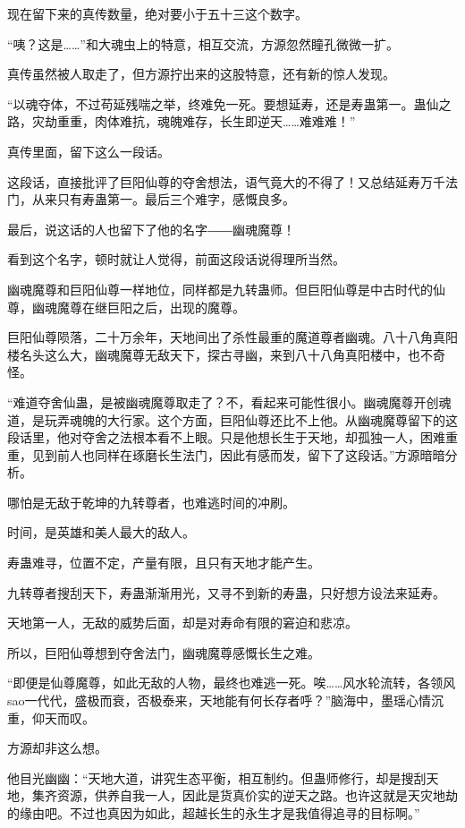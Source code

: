 \begin{this_body}
现在留下来的真传数量，绝对要小于五十三这个数字。

“咦？这是……”和大魂虫上的特意，相互交流，方源忽然瞳孔微微一扩。

真传虽然被人取走了，但方源拧出来的这股特意，还有新的惊人发现。

“以魂夺体，不过苟延残喘之举，终难免一死。要想延寿，还是寿蛊第一。蛊仙之路，灾劫重重，肉体难抗，魂魄难存，长生即逆天……难难难！”

真传里面，留下这么一段话。

这段话，直接批评了巨阳仙尊的夺舍想法，语气竟大的不得了！又总结延寿万千法门，从来只有寿蛊第一。最后三个难字，感慨良多。

最后，说这话的人也留下了他的名字――幽魂魔尊！

看到这个名字，顿时就让人觉得，前面这段话说得理所当然。

幽魂魔尊和巨阳仙尊一样地位，同样都是九转蛊师。但巨阳仙尊是中古时代的仙尊，幽魂魔尊在继巨阳之后，出现的魔尊。

巨阳仙尊陨落，二十万余年，天地间出了杀性最重的魔道尊者幽魂。八十八角真阳楼名头这么大，幽魂魔尊无敌天下，探古寻幽，来到八十八角真阳楼中，也不奇怪。

“难道夺舍仙蛊，是被幽魂魔尊取走了？不，看起来可能性很小。幽魂魔尊开创魂道，是玩弄魂魄的大行家。这个方面，巨阳仙尊还比不上他。从幽魂魔尊留下的这段话里，他对夺舍之法根本看不上眼。只是他想长生于天地，却孤独一人，困难重重，见到前人也同样在琢磨长生法门，因此有感而发，留下了这段话。”方源暗暗分析。

哪怕是无敌于乾坤的九转尊者，也难逃时间的冲刷。

时间，是英雄和美人最大的敌人。

寿蛊难寻，位置不定，产量有限，且只有天地才能产生。

九转尊者搜刮天下，寿蛊渐渐用光，又寻不到新的寿蛊，只好想方设法来延寿。

天地第一人，无敌的威势后面，却是对寿命有限的窘迫和悲凉。

所以，巨阳仙尊想到夺舍法门，幽魂魔尊感慨长生之难。

“即便是仙尊魔尊，如此无敌的人物，最终也难逃一死。唉……风水轮流转，各领风sao一代代，盛极而衰，否极泰来，天地能有何长存者呼？”脑海中，墨瑶心情沉重，仰天而叹。

方源却非这么想。

他目光幽幽：“天地大道，讲究生态平衡，相互制约。但蛊师修行，却是搜刮天地，集齐资源，供养自我一人，因此是货真价实的逆天之路。也许这就是天灾地劫的缘由吧。不过也真因为如此，超越长生的永生才是我值得追寻的目标啊。”


\end{this_body}
